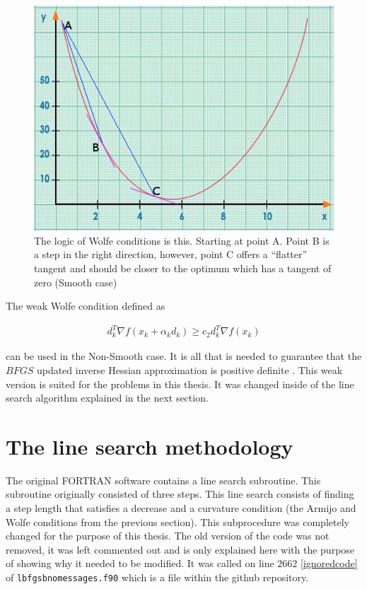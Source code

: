 \begin{figure} 
\begin{center}
\includegraphics[scale=0.65]{Figures/wolfe.png}
\caption[The Idea behind the Wolfe Condition]{The logic of Wolfe conditions is this. Starting at point A. Point B is a step in the right direction, however, point C offers a ``flatter'' tangent and should be closer to the optimum which has a tangent of zero (Smooth case)}
\label{wolfefigure}
\end{center}
\end{figure}

The weak Wolfe condition defined as

\begin{equation}
  \begin{aligned}
    d_k^T \nabla f(x_k + \alpha _k d_k) \geq c_2 d_k^T \nabla f(x_k)
  \end{aligned}
\end{equation}

can be used in the Non-Smooth case. It is all that is needed to guarantee that the $BFGS$ updated inverse Hessian approximation is positive definite \citep{overtonlewis}. This weak version is suited for the problems in this thesis. It was changed inside of the line search algorithm explained in the next section.

\section{The line search methodology}

The original \textsc{FORTRAN} software\citep{lbfgsbsoftware} contains a line search subroutine. This subroutine originally consisted of three steps. This line search consists of finding a step length that satisfies a decrease and a curvature condition (the Armijo and Wolfe conditions from the previous section). This subprocedure was completely changed for the purpose of this thesis. The old version of the code was not removed, it was left commented out and is only explained here with the purpose of showing why it needed to be modified. It was called on line $2662$ \ref{ignoredcode} of \texttt{lbfgsbnomessages.f90} which is a file within the github repository\citep{lbfgsbNS}.

